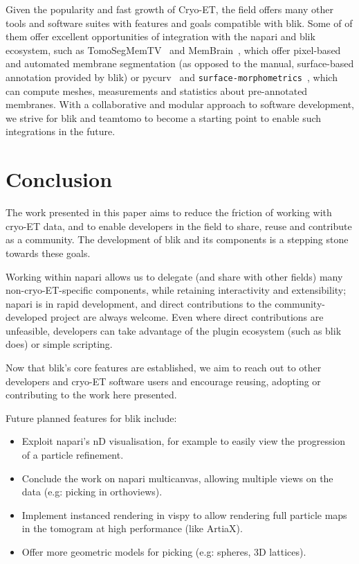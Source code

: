 \vspace{\baselineskip}

Given the popularity and fast growth of Cryo-ET, the field offers many other tools and software suites with features and goals compatible with blik. Some of of them offer excellent opportunities of integration with the napari and blik ecosystem, such as TomoSegMemTV~\cite{martinez-sanchezRobustMembraneDetection2014} and MemBrain~\cite{lammMemBrainDeepLearningaided2022,lammMemBrainV2Endtoend2024}, which offer pixel-based and automated membrane segmentation (as opposed to the manual, surface-based annotation provided by blik) or pycurv~\cite{salferReliableEstimationMembrane2020} and \texttt{surface-morphometrics}~\cite{baradQuantifyingOrganellarUltrastructure2023}, which can compute meshes, measurements and statistics about pre-annotated membranes. With a collaborative and modular approach to software development, we strive for blik and teamtomo to become a starting point to enable such integrations in the future.

\section{Conclusion}

The work presented in this paper aims to reduce the friction of working with cryo-ET data, and to enable developers in the field to share, reuse and contribute as a community. The development of blik and its components is a stepping stone towards these goals.

Working within napari allows us to delegate (and share with other fields) many non-cryo-ET-specific components, while retaining interactivity and extensibility; napari is in rapid development, and direct contributions to the community-developed project are always welcome. Even where direct contributions are unfeasible, developers can take advantage of the plugin ecosystem (such as blik does) or simple scripting.

Now that blik's core features are established, we aim to reach out to other developers and cryo-ET software users and encourage reusing, adopting or contributing to the work here presented.

Future planned features for blik include:

\begin{itemize}[noitemsep] 
    \item Exploit napari's nD visualisation, for example to easily view the progression of a particle refinement.
    \item Conclude the work on napari multicanvas, allowing multiple views on the data (e.g: picking in orthoviews).
    \item Implement instanced rendering in vispy to allow rendering full particle maps in the tomogram at high performance (like ArtiaX).
    \item Offer more geometric models for picking (e.g: spheres, 3D lattices).
\end{itemize}

